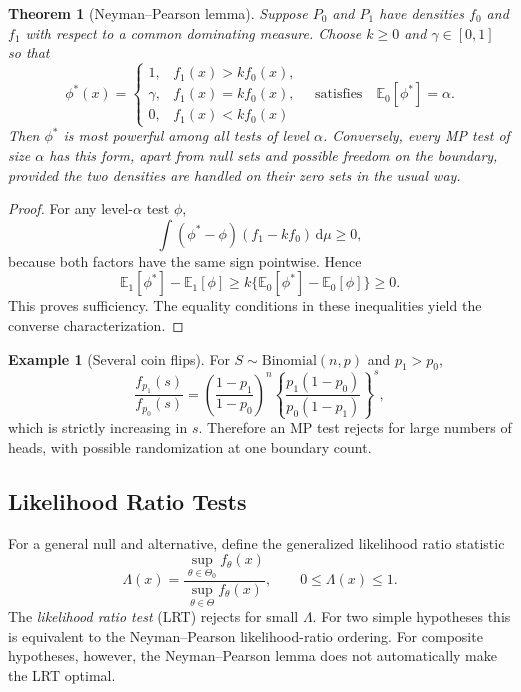 \documentclass[12pt,oneside]{book}
\numberwithin{equation}{section}
\theoremstyle{definition}
\newtheorem{example}{Example}[section]
\theoremstyle{plain}
\newtheorem{theorem}{Theorem}[section]
\theoremstyle{remark}
\newcommand{\E}{\mathbb{E}}
\newcommand{\dd}{\,\mathrm{d}}
\newcommand{\Bin}{\mathrm{Binomial}}
\begin{document}
\begin{theorem}[Neyman--Pearson lemma]
Suppose $P_0$ and $P_1$ have densities $f_0$ and $f_1$ with respect to a
common dominating measure.  Choose $k\geq0$ and $\gamma\in[0,1]$ so that
\begin{equation}
 \phi^*(x)=
 \begin{cases}
  1,&f_1(x)>kf_0(x),\\
  \gamma,&f_1(x)=kf_0(x),\\
  0,&f_1(x)<kf_0(x)
 \end{cases}
 \quad\text{satisfies}\quad \E_0[\phi^*]=\alpha.
 \label{eq:np-test}
\end{equation}
Then $\phi^*$ is most powerful among all tests of level $\alpha$.  Conversely,
every MP test of size $\alpha$ has this form, apart from null sets and possible
freedom on the boundary, provided the two densities are handled on their
zero sets in the usual way.
\end{theorem}

\begin{proof}
For any level-$\alpha$ test $\phi$,
\[
 \int(\phi^*-\phi)(f_1-kf_0)\dd\mu\geq0,
\]
because both factors have the same sign pointwise.  Hence
\[
 \E_1[\phi^*]-\E_1[\phi]
 \geq k\{\E_0[\phi^*]-\E_0[\phi]\}\geq0.
\]
This proves sufficiency.  The equality conditions in these inequalities yield
the converse characterization.
\end{proof}

\begin{example}[Several coin flips]
For $S\sim\Bin(n,p)$ and $p_1>p_0$,
\[
 \frac{f_{p_1}(s)}{f_{p_0}(s)}
 =\left(\frac{1-p_1}{1-p_0}\right)^n
  \left\{\frac{p_1(1-p_0)}{p_0(1-p_1)}\right\}^{s},
\]
which is strictly increasing in $s$.  Therefore an MP test rejects for large
numbers of heads, with possible randomization at one boundary count.
\end{example}

\subsection{Likelihood Ratio Tests}

For a general null and alternative, define the generalized likelihood ratio
statistic
\begin{equation}
    \Lambda(x)=
    \frac{\sup_{\theta\in\Theta_0}f_\theta(x)}
         {\sup_{\theta\in\Theta}f_\theta(x)},
    \qquad 0\leq\Lambda(x)\leq1.
    \label{eq:generalized-lr}
\end{equation}
The \emph{likelihood ratio test} (LRT) rejects for small $\Lambda$.  For two
simple hypotheses this is equivalent to the Neyman--Pearson likelihood-ratio
ordering.  For composite hypotheses, however, the Neyman--Pearson lemma does
not automatically make the LRT optimal.
\end{document}
